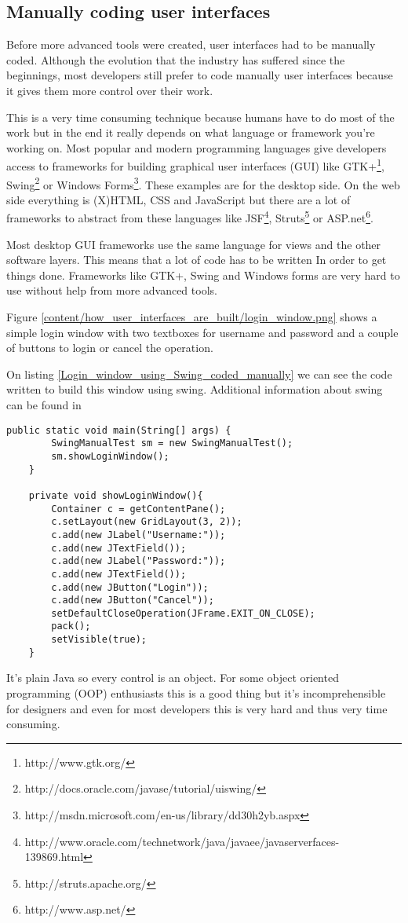 \subsection{Manually coding user interfaces}
Before more advanced tools were created, user interfaces had to be manually coded. Although the evolution that the industry has suffered since the beginnings, most developers still prefer to code manually user interfaces because it gives them more control over their work.

This is a very time consuming technique because humans have to do most of the work but in the end it really depends on what language or framework you're working on. Most popular and modern programming languages give developers access to frameworks for building graphical user interfaces (GUI) like GTK+\footnote{http://www.gtk.org/}, Swing\footnote{http://docs.oracle.com/javase/tutorial/uiswing/} or Windows Forms\footnote{http://msdn.microsoft.com/en-us/library/dd30h2yb.aspx}. These examples are for the desktop side. On the web side everything is (X)HTML, CSS and JavaScript but there are a lot of frameworks to abstract from these languages like JSF\footnote{http://www.oracle.com/technetwork/java/javaee/javaserverfaces-139869.html}, Struts\footnote{http://struts.apache.org/} or ASP.net\footnote{http://www.asp.net/}.

Most desktop GUI frameworks use the same language for views and the other software layers. This means that a lot of code has to be written In order to get things done. Frameworks like GTK+, Swing and Windows forms are very hard to use without help from more advanced tools.

Figure \ref{content/how_user_interfaces_are_built/login_window.png} shows a simple login window with two textboxes for username and password and a couple of buttons to login or cancel the operation.

On listing \ref{Login_window_using_Swing_coded_manually} we can see the code written to build this window using swing. Additional information about swing can be found in \cite{Java_Swing}

\lstset{language=Java}
\begin{lstlisting}[caption={Login window using Swing, coded manually},label=Login_window_using_Swing_coded_manually]
public static void main(String[] args) {
        SwingManualTest sm = new SwingManualTest();
        sm.showLoginWindow();
    }

    private void showLoginWindow(){
        Container c = getContentPane();
        c.setLayout(new GridLayout(3, 2));
        c.add(new JLabel("Username:"));
        c.add(new JTextField());
        c.add(new JLabel("Password:"));
        c.add(new JTextField());
        c.add(new JButton("Login"));
        c.add(new JButton("Cancel"));
        setDefaultCloseOperation(JFrame.EXIT_ON_CLOSE);
        pack();
        setVisible(true);
    }
\end{lstlisting}
It's plain Java so every control is an object. For some object oriented programming (OOP) enthusiasts this is a good thing but it's incomprehensible for designers and even for most developers this is very hard and thus very time consuming.

